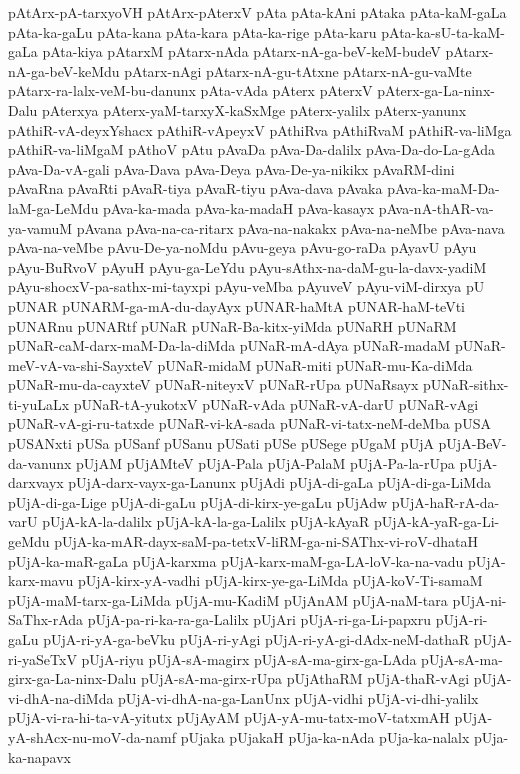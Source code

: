 {pAtArx-pA-tarxyoVH
pAtArx-pAterxV
pAta
pAta-kAni
pAtaka
pAta-kaM-gaLa
pAta-ka-gaLu
pAta-kana
pAta-kara
pAta-ka-rige
pAta-karu
pAta-ka-sU-ta-kaM-gaLa
pAta-kiya
pAtarxM
pAtarx-nAda
pAtarx-nA-ga-beV-keM-budeV
pAtarx-nA-ga-beV-keMdu
pAtarx-nAgi
pAtarx-nA-gu-tAtxne
pAtarx-nA-gu-vaMte
pAtarx-ra-lalx-veM-bu-danunx
pAta-vAda
pAterx
pAterxV
pAterx-ga-La-ninx-Dalu
pAterxya
pAterx-yaM-tarxyX-kaSxMge
pAterx-yalilx
pAterx-yanunx
pAthiR-vA-deyxYshacx
pAthiR-vApeyxV
pAthiRva
pAthiRvaM
pAthiR-va-liMga
pAthiR-va-liMgaM
pAthoV
pAtu
pAvaDa
pAva-Da-dalilx
pAva-Da-do-La-gAda
pAva-Da-vA-gali
pAva-Dava
pAva-Deya
pAva-De-ya-nikikx
pAvaRM-dini
pAvaRna
pAvaRti
pAvaR-tiya
pAvaR-tiyu
pAva-dava
pAvaka
pAva-ka-maM-Da-laM-ga-LeMdu
pAva-ka-mada
pAva-ka-madaH
pAva-kasayx
pAva-nA-thAR-va-ya-vamuM
pAvana
pAva-na-ca-ritarx
pAva-na-nakakx
pAva-na-neMbe
pAva-nava
pAva-na-veMbe
pAvu-De-ya-noMdu
pAvu-geya
pAvu-go-raDa
pAyavU
pAyu
pAyu-BuRvoV
pAyuH
pAyu-ga-LeYdu
pAyu-sAthx-na-daM-gu-la-davx-yadiM
pAyu-shocxV-pa-sathx-mi-tayxpi
pAyu-veMba
pAyuveV
pAyu-viM-dirxya
pU
pUNAR
pUNARM-ga-mA-du-dayAyx
pUNAR-haMtA
pUNAR-haM-teVti
pUNARnu
pUNARtf
pUNaR
pUNaR-Ba-kitx-yiMda
pUNaRH
pUNaRM
pUNaR-caM-darx-maM-Da-la-diMda
pUNaR-mA-dAya
pUNaR-madaM
pUNaR-meV-vA-va-shi-SayxteV
pUNaR-midaM
pUNaR-miti
pUNaR-mu-Ka-diMda
pUNaR-mu-da-cayxteV
pUNaR-niteyxV
pUNaR-rUpa
pUNaRsayx
pUNaR-sithx-ti-yuLaLx
pUNaR-tA-yukotxV
pUNaR-vAda
pUNaR-vA-darU
pUNaR-vAgi
pUNaR-vA-gi-ru-tatxde
pUNaR-vi-kA-sada
pUNaR-vi-tatx-neM-deMba
pUSA
pUSANxti
pUSa
pUSanf
pUSanu
pUSati
pUSe
pUSege
pUgaM
pUjA
pUjA-BeV-da-vanunx
pUjAM
pUjAMteV
pUjA-Pala
pUjA-PalaM
pUjA-Pa-la-rUpa
pUjA-darxvayx
pUjA-darx-vayx-ga-Lanunx
pUjAdi
pUjA-di-gaLa
pUjA-di-ga-LiMda
pUjA-di-ga-Lige
pUjA-di-gaLu
pUjA-di-kirx-ye-gaLu
pUjAdw
pUjA-haR-rA-da-varU
pUjA-kA-la-dalilx
pUjA-kA-la-ga-Lalilx
pUjA-kAyaR
pUjA-kA-yaR-ga-Li-geMdu
pUjA-ka-mAR-dayx-saM-pa-tetxV-liRM-ga-ni-SAThx-vi-roV-dhataH
pUjA-ka-maR-gaLa
pUjA-karxma
pUjA-karx-maM-ga-LA-loV-ka-na-vadu
pUjA-karx-mavu
pUjA-kirx-yA-vadhi
pUjA-kirx-ye-ga-LiMda
pUjA-koV-Ti-samaM
pUjA-maM-tarx-ga-LiMda
pUjA-mu-KadiM
pUjAnAM
pUjA-naM-tara
pUjA-ni-SaThx-rAda
pUjA-pa-ri-ka-ra-ga-Lalilx
pUjAri
pUjA-ri-ga-Li-papxru
pUjA-ri-gaLu
pUjA-ri-yA-ga-beVku
pUjA-ri-yAgi
pUjA-ri-yA-gi-dAdx-neM-dathaR
pUjA-ri-yaSeTxV
pUjA-riyu
pUjA-sA-magirx
pUjA-sA-ma-girx-ga-LAda
pUjA-sA-ma-girx-ga-La-ninx-Dalu
pUjA-sA-ma-girx-rUpa
pUjAthaRM
pUjA-thaR-vAgi
pUjA-vi-dhA-na-diMda
pUjA-vi-dhA-na-ga-LanUnx
pUjA-vidhi
pUjA-vi-dhi-yalilx
pUjA-vi-ra-hi-ta-vA-yitutx
pUjAyAM
pUjA-yA-mu-tatx-moV-tatxmAH
pUjA-yA-shAcx-nu-moV-da-namf
pUjaka
pUjakaH
pUja-ka-nAda
pUja-ka-nalalx
pUja-ka-napavx
}
